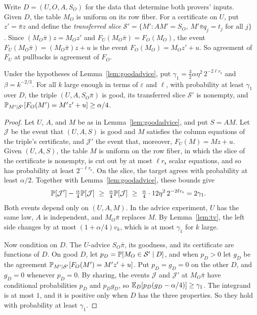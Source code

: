 \label{nt:transfer}Write $D=(U,O,A,S_O)$ for the data that determine both provers' inputs. Given $D$, the table $M_O$ is uniform on its row fiber. For a certificate on $U$, put $z'=\bar\pi z$ and define the \emph{transferred slice} $\mathcal S'=\{M':AM'=S_O,\ M'\bar\pi q_j=t_j\text{ for all }j\}$. Since $(M_O\bar\pi)z=M_Oz'$ and $F_U(M_O\bar\pi)=F_O(M_O)$, the event $F_U(M_O\bar\pi)=(M_O\bar\pi)z+u$ is the event $F_O(M_O)=M_Oz'+u$. So agreement of $F_U$ at pullbacks is agreement of $F_O$.

\begin{lemma}\label{lem:transfer}
Under the hypotheses of Lemma~\ref{lem:goodadvice}, put $\gamma_1=\tfrac32\alpha\eta^2\,2^{-2\ell r_{\mathrm s}}$ and $\beta=k^{-2/3}$. For all $k$ large enough in terms of $\varepsilon$ and $\ell$, with probability at least $\gamma_1$ over $D$, the triple $(U,A,S_O\bar\pi)$ is good, its transferred slice $\mathcal S'$ is nonempty, and $\mathbb{P}_{M'\mid\mathcal S'}[F_O(M')=M'z'+u]\ge\alpha/4$.
\end{lemma}

\begin{proof}
Let $U$, $A$, and $M$ be as in Lemma~\ref{lem:goodadvice}, and put $S=AM$. Let $\mathcal J$ be the event that $(U,A,S)$ is good and $M$ satisfies the column equations of the triple's certificate, and $\mathcal J'$ the event that, moreover, $F_U(M)=Mz+u$. Given $(U,A,S)$, the table $M$ is uniform on the row fiber, in which the slice of the certificate is nonempty, is cut out by at most $\ell r_{\mathrm s}$ scalar equations, and so has probability at least $2^{-\ell r_{\mathrm s}}$. On the slice, the target agrees with probability at least $\alpha/2$. Together with Lemma~\ref{lem:goodadvice}, these bounds give
\[
\Prob[\mathcal J']-\tfrac\alpha4\Prob[\mathcal J]\ \ge\ \tfrac\alpha4\Prob[\mathcal J]\ \ge\ \tfrac\alpha4\cdot12\eta^2\,2^{-2\ell r_{\mathrm s}}=2\gamma_1.
\]
Both events depend only on $(U,A,M)$. In the advice experiment, $U$ has the same law, $A$ is independent, and $M_O\bar\pi$ replaces $M$. By Lemma~\ref{lem:tv}, the left side changes by at most $(1+\alpha/4)v_k$, which is at most $\gamma_1$ for $k$ large.

Now condition on $D$. The $U$-advice $S_O\bar\pi$, its goodness, and its certificate are functions of $D$. On good $D$, let $p_D=\mathbb{P}[M_O\in\mathcal S'\mid D]$, and when $p_D>0$ let $g_D$ be the agreement $\mathbb{P}_{M'\mid\mathcal S'}[F_O(M')=M'z'+u]$. Put $p_D=g_D=0$ on the other $D$, and $g_D=0$ whenever $p_D=0$. By sharing, the events $\mathcal J$ and $\mathcal J'$ at $M_O\bar\pi$ have conditional probabilities $p_D$ and $p_Dg_D$, so $\mathbb{E}_D[p_D(g_D-\alpha/4)]\ge\gamma_1$. The integrand is at most $1$, and it is positive only when $D$ has the three properties. So they hold with probability at least $\gamma_1$.
\end{proof}


